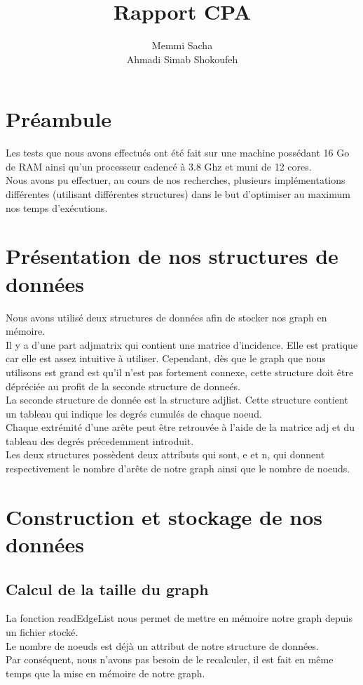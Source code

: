 \documentclass[a4paper,10pt]{report}
\title{Rapport CPA}
\author{Memmi Sacha \\ Ahmadi Simab Shokoufeh }
\begin{document}
\maketitle

\chapter{Préambule}
Les tests que nous avons effectués ont été fait sur une machine possédant 16 Go de RAM ainsi qu'un processeur cadencé à 3.8 Ghz et muni de 12 cores.
\\
Nous avons pu effectuer, au cours de nos recherches, plusieurs implémentations différentes (utilisant différentes structures) dans le but d'optimiser au maximum nos temps d'exécutions. 
\newline 

\chapter{Présentation de nos structures de données}
Nous avons utilisé deux structures de données afin de stocker nos graph en mémoire.
\\
Il y a d'une part adjmatrix qui contient une matrice d'incidence. Elle est pratique car elle est assez intuitive à utiliser. Cependant, dès que le graph que nous utilisons est grand est qu'il n'est pas fortement connexe, cette structure doit être dépréciée au profit de la seconde structure de donneés.
\\
La seconde structure de donnée est la structure adjlist. Cette structure contient un tableau qui indique les degrés cumulés de chaque noeud. 
\\
Chaque extrémité d'une arête peut être retrouvée à l'aide de la matrice adj et du tableau des degrés précedemment introduit.
\\
Les deux structures possèdent deux attributs qui sont, e et n, qui donnent respectivement le nombre d'arête de notre graph ainsi que le nombre de noeuds.
\chapter{Construction et stockage de nos données}
\section{Calcul de la taille du graph}
La fonction readEdgeList nous permet de mettre en mémoire notre graph depuis un fichier stocké. 
\\
Le nombre de noeuds est déjà un attribut de notre structure de données. 
\\Par conséquent, nous n'avons pas besoin de le recalculer, il est fait en même temps que la mise en mémoire de notre graph.
\end{document}
